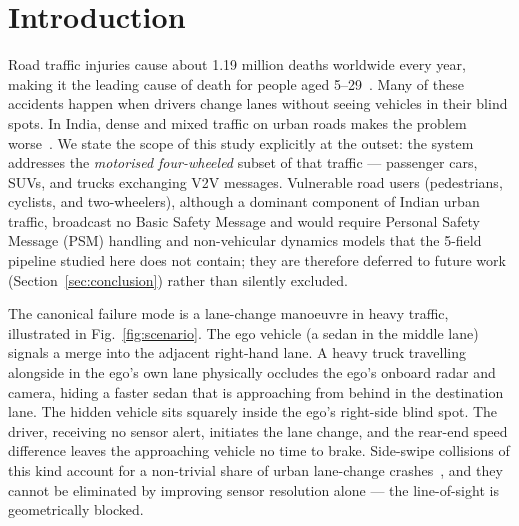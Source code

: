 \documentclass[sn-mathphys-num,Numbered,iicol]{sn-jnl}
\begin{document}

\maketitle

\section{Introduction}\label{sec:introduction}

Road traffic injuries cause about 1.19 million deaths worldwide every year, making it the leading cause of death for people aged 5--29~\cite{who2023}. Many of these accidents happen when drivers change lanes without seeing vehicles in their blind spots. In India, dense and mixed traffic on urban roads makes the problem worse~\cite{morth2023}. We state the scope of this study explicitly at the outset: the system addresses the \emph{motorised four-wheeled} subset of that traffic --- passenger cars, SUVs, and trucks exchanging V2V messages. Vulnerable road users (pedestrians, cyclists, and two-wheelers), although a dominant component of Indian urban traffic, broadcast no Basic Safety Message and would require Personal Safety Message (PSM) handling and non-vehicular dynamics models that the 5-field pipeline studied here does not contain; they are therefore deferred to future work (Section~\ref{sec:conclusion}) rather than silently excluded.

The canonical failure mode is a lane-change manoeuvre in heavy traffic, illustrated in Fig.~\ref{fig:scenario}. The ego vehicle (a sedan in the middle lane) signals a merge into the adjacent right-hand lane. A heavy truck travelling alongside in the ego's own lane physically occludes the ego's onboard radar and camera, hiding a faster sedan that is approaching from behind in the destination lane. The hidden vehicle sits squarely inside the ego's right-side blind spot. The driver, receiving no sensor alert, initiates the lane change, and the rear-end speed difference leaves the approaching vehicle no time to brake. Side-swipe collisions of this kind account for a non-trivial share of urban lane-change crashes~\cite{biswas2006}, and they cannot be eliminated by improving sensor resolution alone --- the line-of-sight is geometrically blocked.
\end{document}
